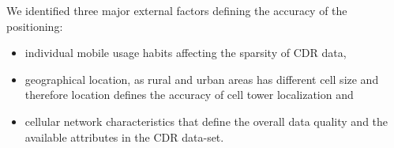 
We identified three major external factors defining the accuracy of the positioning:
\begin{itemize}
    \item individual mobile usage habits affecting the sparsity of CDR data,
    \item geographical location, as rural and urban areas has different cell size and therefore location defines the accuracy of cell tower localization and
    \item cellular network characteristics that define the overall data quality and the available attributes in the CDR data-set.
\end{itemize}
